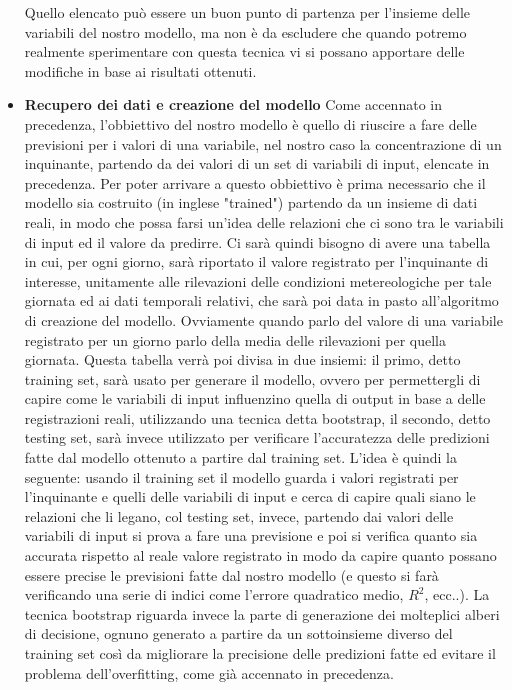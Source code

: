 \documentclass{article}
\begin{document}
\begin{itemize}
Quello elencato può essere un buon punto di partenza per l'insieme delle variabili del nostro modello, ma non è da escludere che quando potremo realmente sperimentare con questa tecnica vi si possano apportare delle modifiche in base ai risultati ottenuti.

\item \textbf{Recupero dei dati e creazione del modello} 
Come accennato in precedenza, l'obbiettivo del nostro modello è quello di riuscire a fare delle previsioni per i valori di una variabile, nel nostro caso la concentrazione di un inquinante, partendo da dei valori di un set di variabili di input, elencate in precedenza. Per poter arrivare a questo obbiettivo è prima necessario che il modello sia costruito (in inglese "trained") partendo da un insieme di dati reali, in modo che possa farsi un'idea delle relazioni che ci sono tra le variabili di input ed il valore da predirre. Ci sarà quindi bisogno di avere una tabella in cui, per ogni giorno, sarà riportato il valore registrato per l'inquinante di interesse, unitamente alle rilevazioni delle condizioni metereologiche per tale giornata ed ai dati temporali relativi, che sarà poi data in pasto all'algoritmo di creazione del modello. Ovviamente quando parlo del valore di una variabile registrato per un giorno parlo della media delle rilevazioni per quella giornata.
Questa tabella verrà poi divisa in due insiemi: il primo, detto training set, sarà usato per generare il modello, ovvero per permettergli di capire come le variabili di input influenzino quella di output in base a delle registrazioni reali, utilizzando una tecnica detta bootstrap, il secondo, detto testing set, sarà invece utilizzato per verificare l'accuratezza delle predizioni fatte dal modello ottenuto a partire dal training set. L'idea è quindi la seguente: usando il training set il modello guarda i valori registrati per l'inquinante e quelli delle variabili di input e cerca di capire quali siano le relazioni che li legano,
col testing set, invece, partendo dai valori delle variabili di input si prova a fare una previsione e poi si verifica quanto sia accurata rispetto al reale valore registrato in modo da capire quanto possano essere precise le previsioni fatte dal nostro modello (e questo si farà verificando una serie di indici come l'errore quadratico medio, $R^2$, ecc..).
La tecnica bootstrap riguarda invece la parte di generazione dei molteplici alberi di decisione, ognuno generato a partire da un sottoinsieme diverso del training set così da migliorare la precisione delle predizioni fatte ed evitare il problema dell'overfitting, come già accennato in precedenza.


\end{itemize}
\end{document}
